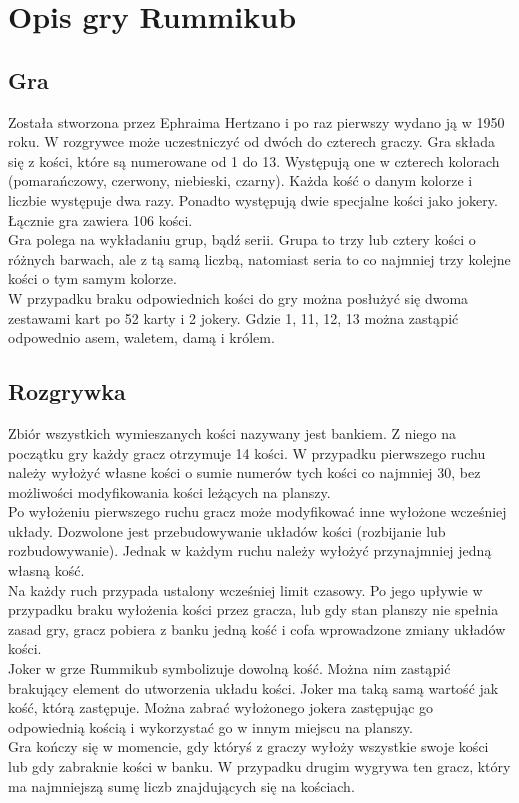 \chapter{Opis gry Rummikub}
\thispagestyle{chapterBeginStyle}
\label{rozdzial1}

\section{Gra}

Została stworzona przez Ephraima Hertzano i po raz pierwszy wydano ją w 1950 roku. W rozgrywce może uczestniczyć od dwóch do czterech graczy. Gra składa się z kości, które są numerowane od 1 do 13. Występują one w czterech kolorach (pomarańczowy, czerwony, niebieski, czarny). Każda kość o danym kolorze i liczbie występuje dwa razy. Ponadto występują dwie specjalne kości jako jokery. Łącznie gra zawiera 106 kości. \\

Gra polega na wykładaniu grup, bądź serii. Grupa to trzy lub cztery kości o różnych barwach, ale z tą samą liczbą, natomiast seria to co najmniej trzy kolejne kości o tym samym kolorze. \\

W przypadku braku odpowiednich kości do gry można posłużyć się dwoma zestawami kart po 52 karty i 2 jokery. Gdzie 1, 11, 12, 13 można zastąpić odpowednio asem, waletem, damą i królem.

\section{Rozgrywka}

Zbiór wszystkich wymieszanych kości nazywany jest bankiem. Z niego na początku gry każdy gracz otrzymuje 14 kości. W przypadku pierwszego ruchu należy wyłożyć własne kości o sumie numerów tych kości co najmniej 30, bez możliwości modyfikowania kości leżących na planszy. \\

Po wyłożeniu pierwszego ruchu gracz może modyfikować inne wyłożone wcześniej układy. Dozwolone jest przebudowywanie układów kości (rozbijanie lub rozbudowywanie). Jednak w każdym ruchu należy wyłożyć przynajmniej jedną własną kość. \\

Na każdy ruch przypada ustalony wcześniej limit czasowy. Po jego upływie w przypadku braku wyłożenia kości przez gracza, lub gdy stan planszy nie spełnia zasad gry, gracz pobiera z banku jedną kość i cofa wprowadzone zmiany układów kości. \\

Joker w grze Rummikub symbolizuje dowolną kość. Można nim zastąpić brakujący element do utworzenia układu kości. Joker ma taką samą wartość jak kość, którą zastępuje. Można zabrać wyłożonego jokera zastępując go odpowiednią kością i wykorzystać go w innym miejscu na planszy. \\

Gra kończy się w momencie, gdy któryś z graczy wyłoży wszystkie swoje kości lub gdy zabraknie kości w banku. W przypadku drugim wygrywa ten gracz, który ma najmniejszą sumę liczb znajdujących się na kościach.


